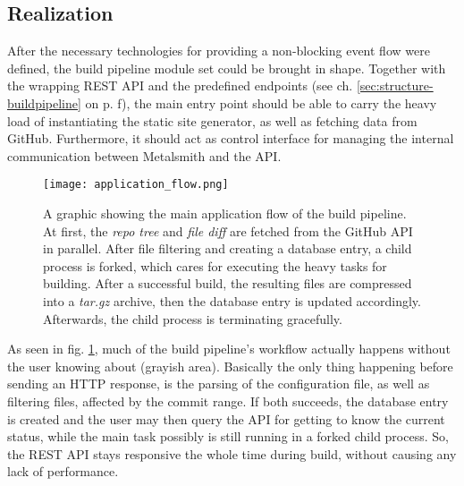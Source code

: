 \subsection{Realization}
After the necessary technologies for providing a non-blocking event flow were defined, the build pipeline module set could be brought in shape. Together with the wrapping REST API and the predefined endpoints (see ch. \ref{sec:structure-buildpipeline} on p. \pageref{sec:structure-buildpipeline}f), the main entry point should be able to carry the heavy load of instantiating the static site generator, as well as fetching data from GitHub. Furthermore, it should act as control interface for managing the internal communication between Metalsmith and the API.

\begin{figure} %
    \centering
    \texttt{[image: application\_flow.png]}
    \caption{A graphic showing the main application flow of the build pipeline. At first, the \emph{repo tree} and \emph{file diff} are fetched from the GitHub API in parallel. After file filtering and creating a database entry, a child process is forked, which cares for executing the heavy tasks for building. After a successful build, the resulting files are compressed into a \emph{tar.gz} archive, then the database entry is updated accordingly. Afterwards, the child process is terminating gracefully.}
    \label{fig:application-flow}
\end{figure}
%

As seen in fig. \ref{fig:application-flow}, much of the build pipeline's workflow actually happens without the user knowing about (grayish area). Basically the only thing happening before sending an HTTP response, is the parsing of the configuration file, as well as filtering files, affected by the commit range. If both succeeds, the database entry is created and the user may then query the API for getting to know the current status, while the main task possibly is still running in a forked child process. So, the REST API stays responsive the whole time during build, without causing any lack of performance.
